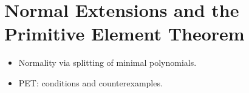\section{Normal Extensions and the Primitive Element Theorem}
\begin{itemize}
  \item Normality via splitting of minimal polynomials.
  \item PET: conditions and counterexamples.
\end{itemize}

